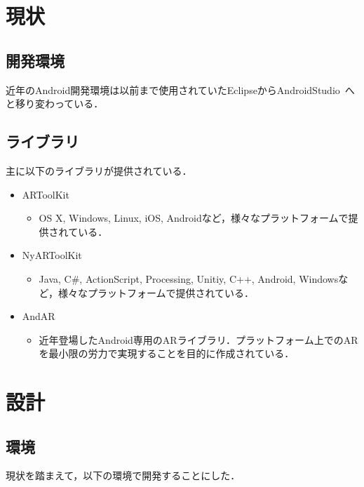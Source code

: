 \documentclass[twocolumn,10pt,a4j]{jsarticle}
\begin{document}
\section{現状}%

\subsection{開発環境}
近年のAndroid開発環境は以前まで使用されていたEclipseからAndroidStudio~\cite{AndroidStudio}へと移り変わっている．

\subsection{ライブラリ}
主に以下のライブラリが提供されている．
\begin{itemize}
 \item ARToolKit
       \begin{itemize}
	\item OS X, Windows, Linux, iOS, Androidなど，様々なプラットフォームで提供されている．\\
       \end{itemize}
 \item NyARToolKit
       \begin{itemize}
	\item Java, C\#, ActionScript, Processing, Unitiy, C++, Android, Windowsなど，様々なプラットフォームで提供されている．
       \end{itemize}
 \item AndAR
       \begin{itemize}
	\item 近年登場したAndroid専用のARライブラリ．プラットフォーム上でのARを最小限の労力で実現することを目的に作成されている．
       \end{itemize}
\end{itemize}

\section{設計}%
\subsection{環境}
現状を踏まえて，以下の環境で開発することにした．
\end{document}
